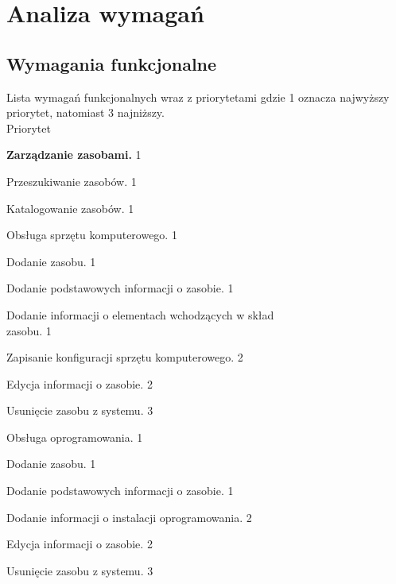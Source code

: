 \section{Analiza wymagań}

\subsection{Wymagania funkcjonalne}
Lista wymagań funkcjonalnych wraz z priorytetami gdzie 1 oznacza najwyższy priorytet, natomiast 3 najniższy. \\

\hfill Priorytet
\begin{myEnumerate}
\item\label{f1} \textbf{Zarządzanie zasobami.}
\hfill 1
	\begin{myEnumerate}
	\item\label{f2} Przeszukiwanie zasobów.
	\hfill 1
	\item\label{f3} Katalogowanie zasobów.
	\hfill 1
	\begin{myEnumerate}

	\item\label{f4} Obsługa sprzętu komputerowego.
	\hfill 1
	\begin{myEnumerate}
		\item\label{f5} Dodanie zasobu.
		\hfill 1
		\begin{myEnumerate}
		\item\label{f6} Dodanie podstawowych informacji o zasobie.
		 \hfill 1
		\item\label{f7} Dodanie informacji o elementach wchodzących w skład \\  zasobu.
		\hfill 1
		\item\label{f8} Zapisanie konfiguracji sprzętu komputerowego.
		\hfill 2
		\end{myEnumerate}
		\item\label{f9} Edycja informacji o zasobie.
		\hfill 2
		\item\label{f10} Usunięcie zasobu z systemu.
		\hfill 3
	\end{myEnumerate}

	\item\label{f11} Obsługa oprogramowania.
	\hfill 1

	\begin{myEnumerate}
		\item\label{f12} Dodanie zasobu.
		\hfill 1
		\begin{myEnumerate}
			\item\label{f13} Dodanie podstawowych informacji o zasobie.
			\hfill 1
			\item\label{f14} Dodanie informacji o instalacji oprogramowania.
			\hfill 2
		\end{myEnumerate}
		\item\label{f15} Edycja informacji o zasobie.
		\hfill 2
		\item\label{f16} Usunięcie zasobu z systemu.
		\hfill 3
	\end{myEnumerate}


\end{myEnumerate}
\end{myEnumerate}
\end{myEnumerate}

